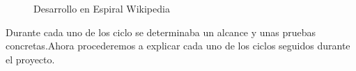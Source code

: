 \begin{figure}[H] 
  \begin{center} 
    \caption{Desarrollo en Espiral Wikipedia} 
    \label{fig:Espiral} 
  \end{center} 
\end{figure}

Durante cada uno de los ciclo se determinaba un alcance y unas pruebas concretas.Ahora procederemos a explicar cada uno de los ciclos seguidos durante el proyecto.

